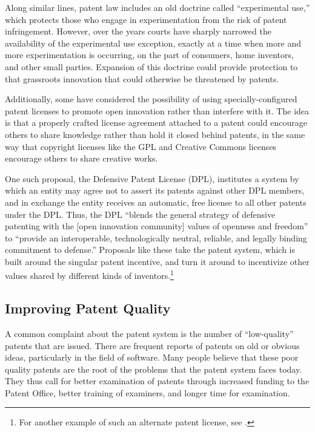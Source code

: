 \documentclass[11pt,twocolumn,titlepage]{article}
\begin{document}
Along similar lines, patent law includes an old doctrine called ``experimental
use,'' which protects those who engage in experimentation from the risk of
patent infringement.
However, over the years courts have sharply narrowed the
availability of the experimental use exception, exactly at a time when more and
more experimentation is occurring, on the part of consumers, home inventors, and
other small parties. Expansion of this doctrine could provide protection to that
grassroots innovation that could otherwise be threatened by patents.

Additionally, some have considered the possibility of using specially-configured
patent licenses to promote open innovation rather than interfere with it. The
idea is
that a properly crafted license agreement attached to a patent could encourage
others to share knowledge rather than hold it closed behind patents, in the same
way that copyright licenses like the GPL and Creative Commons licenses encourage
others to share creative works.

One such proposal, the Defensive Patent License (DPL), institutes a system by
which an entity may agree not to assert its patents against other DPL members,
and in exchange the entity receives an automatic, free license to all other
patents under the DPL. Thus, the DPL ``blends the general
strategy of defensive patenting with the [open innovation community] values of
openness and freedom'' to ``provide an interoperable, technologically neutral,
reliable, and legally binding commitment to defense.'' Proposals
like these take the patent system, which is built around the singular patent
incentive, and turn it around to incentivize other values shared by different
kinds of inventors.\footnote{For another example of such an alternate patent
license, see .}

\subsection{Improving Patent Quality}
\SectionNote
{}

A common complaint about the patent system is the number of ``low-quality''
patents that are issued. There are frequent reports of patents on old or obvious ideas,
particularly in the field of software. Many
people believe that these poor quality patents are the root of the problems that
the patent system faces today. They thus call for better examination of patents
through increased funding to the Patent Office, better training of examiners,
and longer time for examination.
\end{document}

